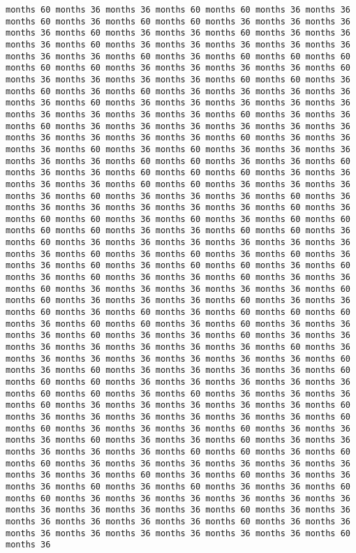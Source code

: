 \documentclass[11pt]{article}
\begin{document}
\begin{Verbatim}[commandchars=\\\{\}, frame=single, framerule=2mm, rulecolor=\color{outerrorbackground}]
months 60 months 36 months 36 months 60 months 60 months 36 months 36 months 60 months 36 months 60 months 60 months 36 months 36 months 36 months 36 months 60 months 36 months 36 months 60 months 36 months 36 months 36 months 60 months 36 months 36 months 36 months 36 months 36 months 36 months 36 months 60 months 36 months 60 months 60 months 60 months 60 months 60 months 36 months 36 months 36 months 36 months 60 months 36 months 36 months 36 months 36 months 60 months 60 months 36 months 60 months 36 months 60 months 36 months 36 months 36 months 36 months 36 months 60 months 36 months 36 months 36 months 36 months 36 months 36 months 36 months 36 months 36 months 60 months 36 months 36 months 60 months 36 months 36 months 36 months 36 months 36 months 36 months 36 months 36 months 36 months 36 months 60 months 36 months 36 months 36 months 60 months 36 months 60 months 36 months 36 months 36 months 36 months 36 months 60 months 60 months 36 months 36 months 60 months 36 months 36 months 60 months 60 months 60 months 36 months 36 months 36 months 36 months 60 months 60 months 36 months 36 months 36 months 36 months 60 months 36 months 36 months 36 months 60 months 36 months 36 months 36 months 36 months 36 months 36 months 60 months 36 months 60 months 60 months 36 months 60 months 36 months 60 months 60 months 60 months 60 months 36 months 36 months 60 months 60 months 36 months 60 months 36 months 36 months 36 months 36 months 36 months 36 months 36 months 60 months 36 months 60 months 36 months 60 months 36 months 36 months 60 months 36 months 60 months 60 months 36 months 60 months 36 months 60 months 36 months 36 months 60 months 36 months 36 months 60 months 36 months 36 months 36 months 36 months 36 months 60 months 60 months 36 months 36 months 36 months 60 months 36 months 36 months 60 months 36 months 60 months 36 months 60 months 60 months 60 months 36 months 60 months 60 months 36 months 60 months 36 months 36 months 36 months 60 months 36 months 36 months 60 months 36 months 36 months 36 months 36 months 36 months 36 months 36 months 60 months 36 months 36 months 36 months 36 months 36 months 36 months 36 months 60 months 36 months 60 months 36 months 36 months 36 months 36 months 60 months 60 months 60 months 36 months 36 months 36 months 36 months 36 months 60 months 60 months 36 months 60 months 36 months 36 months 36 months 60 months 36 months 36 months 36 months 36 months 36 months 60 months 36 months 36 months 36 months 36 months 36 months 36 months 60 months 60 months 36 months 36 months 36 months 60 months 36 months 36 months 36 months 60 months 36 months 36 months 60 months 36 months 36 months 36 months 36 months 36 months 60 months 60 months 36 months 60 months 60 months 36 months 36 months 36 months 36 months 36 months 36 months 36 months 36 months 60 months 36 months 60 months 36 months 36 months 36 months 60 months 36 months 60 months 36 months 36 months 60 months 60 months 36 months 36 months 36 months 36 months 36 months 36 months 36 months 36 months 36 months 36 months 60 months 36 months 36 months 36 months 36 months 36 months 36 months 60 months 36 months 36 months 36 months 36 months 36 months 36 months 36 months 36 months 60 months 36 
\end{Verbatim}
\end{document}
